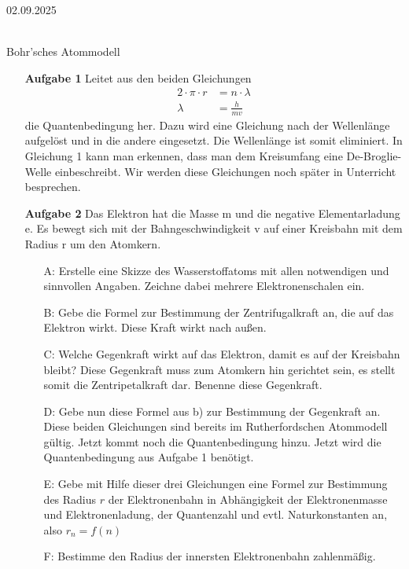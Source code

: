 \documentclass[11pt,a4paper,oneside]{article}
\newcommand{\lessondate}[1]{\noindent\hfill\textcolor{MarginalGray}{\textsc{#1}} \\ \vspace{0.5cm}}
\begin{document}
	
	
	
	\newpage
	\lessondate{02.09.2025}\\
	
	\begin{aufgabe}{Bohr'sches Atommodell}
		\small
		\begin{itemize}[left=20mm]
			\item [\textbf{Aufgabe 1}] Leitet aus den beiden Gleichungen 
			\begin{align*}
				2 \cdot \pi \cdot r &= n \cdot \lambda \\
				\lambda &= \frac{h}{mv}
			\end{align*}
			die Quantenbedingung her. Dazu wird eine Gleichung nach der Wellenlänge aufgelöst und in die
			andere eingesetzt. Die Wellenlänge ist somit eliminiert. In Gleichung 1 kann man erkennen, dass man
			dem Kreisumfang eine De-Broglie-Welle einbeschreibt. Wir werden diese Gleichungen noch später in
			Unterricht besprechen.
			\item [\textbf{Aufgabe 2}] 
			Das Elektron hat die Masse m und die negative Elementarladung e. Es bewegt sich mit der Bahngeschwindigkeit v auf einer Kreisbahn mit dem Radius r um den Atomkern.
			\begin{itemize}[left=-10mm]
				\item [A:] Erstelle eine Skizze des Wasserstoffatoms mit allen notwendigen und sinnvollen Angaben. Zeichne dabei mehrere Elektronenschalen ein.
				\item [B:] Gebe die Formel zur Bestimmung der Zentrifugalkraft an, die auf das Elektron wirkt. Diese
				Kraft wirkt nach außen.
				\item [C:] Welche Gegenkraft wirkt auf das Elektron, damit es auf der Kreisbahn bleibt? Diese Gegenkraft muss zum Atomkern hin gerichtet sein, es stellt somit die Zentripetalkraft dar. Benenne diese Gegenkraft.
				\item [D:] Gebe nun diese Formel aus b) zur Bestimmung der Gegenkraft an. \\
				Diese beiden Gleichungen sind bereits im Rutherfordschen Atommodell gültig. Jetzt kommt noch die
				Quantenbedingung hinzu. Jetzt wird die Quantenbedingung aus Aufgabe 1 benötigt.
				\item [E:]  Gebe mit Hilfe dieser drei Gleichungen eine Formel zur Bestimmung des Radius $r$ der Elektronenbahn in Abhängigkeit der Elektronenmasse und Elektronenladung, der Quantenzahl und
				evtl. Naturkonstanten an, also $r_n = f(n)$
				\item [F:] Bestimme den Radius der innersten Elektronenbahn zahlenmäßig.

\end{itemize}
\end{itemize}
\end{aufgabe}
\end{document}
